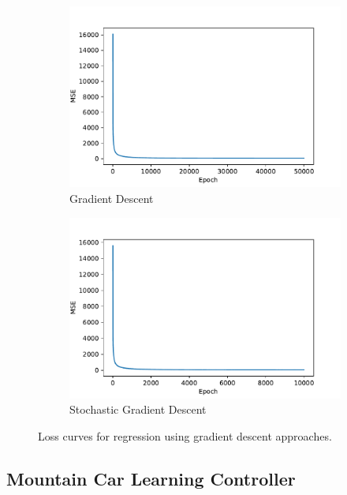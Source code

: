 \documentclass{article}
\begin{document}
\begin{figure}
    \centering
    \begin{subfigure}{.49\linewidth}
        \centering
        \includegraphics[width=\linewidth]{Figures/gd-loss.pdf}
        \caption{Gradient Descent}
    \end{subfigure}
    \begin{subfigure}{.49\linewidth}
        \centering
        \includegraphics[width=\linewidth]{Figures/sgd-loss.pdf}
        \caption{Stochastic Gradient Descent}
    \end{subfigure}
    \caption{Loss curves for regression using gradient descent approaches.}
    \label{fig:gd-loss}
\end{figure}

\subsection{Mountain Car Learning Controller}


\printbibliography
\end{document}
